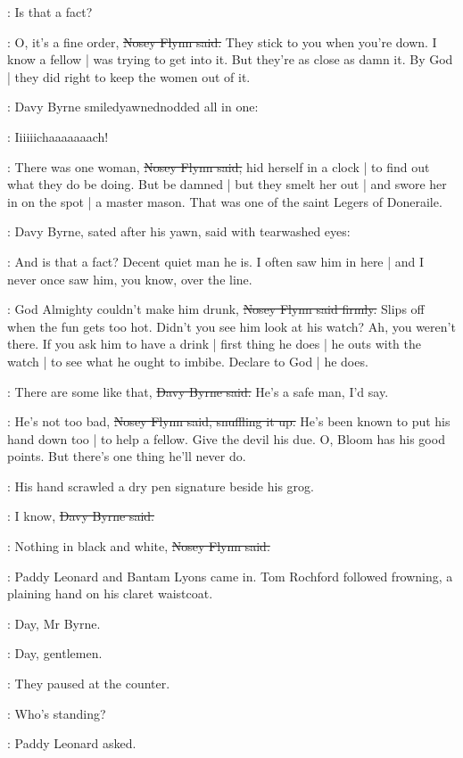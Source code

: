 \davybyrne:
Is that a fact?

\nosey:
O, it's a fine order,
\sout{Nosey Flynn said.}
They stick to you when you're down.
I know a fellow |
was trying to get into it.
But they're as close as damn it.
By God |
they did right to keep the women out of it.

:
Davy Byrne smiled\-yawned\-nodded all in one:

\davybyrne:
Iiiiiichaaaaaaach!

\nosey:
There was one woman,
\sout{Nosey Flynn said,}
hid herself in a clock |
to find out what they do be doing.
But be damned |
but they smelt her out |
and swore her in on the spot |
a master mason.
That was one of the saint Legers of Doneraile.

:
Davy Byrne,
sated after his yawn,
said with tearwashed eyes:

\davybyrne:
And is that a fact?
Decent quiet man he is.
I often saw him in here |
and I never once saw him,
you know,
over the line.

\nosey:
God Almighty couldn't make him drunk,
\sout{Nosey Flynn said firmly.}
Slips off when the fun gets too hot.
Didn't you see him look at his watch?
Ah, you weren't there.
If you ask him to have a drink |
first thing he does |
he outs with the watch |
to see what he ought to imbibe.
Declare to God |
he does.

\davybyrne:
There are some like that,
\sout{Davy Byrne said.}
He's a safe man,
I'd say.

\nosey:
He's not too bad,
\sout{Nosey Flynn said, snuffling it up.}
He's been known to put his hand down too |
to help a fellow.
Give the devil his due.
O, Bloom has his good points.
But there's one thing he'll never do.

:
His hand scrawled a dry pen signature beside his grog.

\davybyrne:
I know,
\sout{Davy Byrne said.}

\nosey:
Nothing in black and white,
\sout{Nosey Flynn said.}

:
Paddy Leonard and Bantam Lyons came in.
Tom Rochford followed frowning,
a plaining hand on his claret waistcoat.

\bantam:
Day, Mr Byrne.

\davybyrne:
Day, gentlemen.

:
They paused at the counter.

\leonard:
Who's standing?

:
Paddy Leonard asked.

